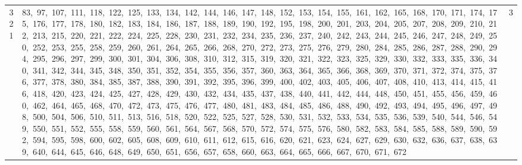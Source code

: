 \begin{longtable}{c|p{}|r}
321 & 83,\ 97,\ 107,\ 111,\ 118,\ 122,\ 125,\ 133,\ 134,\ 142,\ 144,\ 146,\ 147,\ 148,\ 152,\ 153,\ 154,\ 155,\ 161,\ 162,\ 165,\ 168,\ 170,\ 171,\ 174,\ 175,\ 176,\ 177,\ 178,\ 180,\ 182,\ 183,\ 184,\ 186,\ 187,\ 188,\ 189,\ 190,\ 192,\ 195,\ 198,\ 200,\ 201,\ 203,\ 204,\ 205,\ 207,\ 208,\ 209,\ 210,\ 212,\ 213,\ 215,\ 220,\ 221,\ 222,\ 224,\ 225,\ 228,\ 230,\ 231,\ 232,\ 234,\ 235,\ 236,\ 237,\ 240,\ 242,\ 243,\ 244,\ 245,\ 246,\ 247,\ 248,\ 249,\ 250,\ 252,\ 253,\ 255,\ 258,\ 259,\ 260,\ 261,\ 264,\ 265,\ 266,\ 268,\ 270,\ 272,\ 273,\ 275,\ 276,\ 279,\ 280,\ 284,\ 285,\ 286,\ 287,\ 288,\ 290,\ 294,\ 295,\ 296,\ 297,\ 299,\ 300,\ 301,\ 304,\ 306,\ 308,\ 310,\ 312,\ 315,\ 319,\ 320,\ 321,\ 322,\ 323,\ 325,\ 329,\ 330,\ 332,\ 333,\ 335,\ 336,\ 340,\ 341,\ 342,\ 344,\ 345,\ 348,\ 350,\ 351,\ 352,\ 354,\ 355,\ 356,\ 357,\ 360,\ 363,\ 364,\ 365,\ 366,\ 368,\ 369,\ 370,\ 371,\ 372,\ 374,\ 375,\ 376,\ 377,\ 378,\ 380,\ 384,\ 385,\ 387,\ 388,\ 390,\ 391,\ 392,\ 395,\ 396,\ 399,\ 400,\ 402,\ 403,\ 405,\ 406,\ 407,\ 408,\ 410,\ 413,\ 414,\ 415,\ 416,\ 418,\ 420,\ 423,\ 424,\ 425,\ 427,\ 428,\ 429,\ 430,\ 432,\ 434,\ 435,\ 437,\ 438,\ 440,\ 441,\ 442,\ 444,\ 448,\ 450,\ 451,\ 455,\ 456,\ 459,\ 460,\ 462,\ 464,\ 465,\ 468,\ 470,\ 472,\ 473,\ 475,\ 476,\ 477,\ 480,\ 481,\ 483,\ 484,\ 485,\ 486,\ 488,\ 490,\ 492,\ 493,\ 494,\ 495,\ 496,\ 497,\ 498,\ 500,\ 504,\ 506,\ 510,\ 511,\ 513,\ 516,\ 518,\ 520,\ 522,\ 525,\ 527,\ 528,\ 530,\ 531,\ 532,\ 533,\ 534,\ 535,\ 536,\ 539,\ 540,\ 544,\ 546,\ 549,\ 550,\ 551,\ 552,\ 555,\ 558,\ 559,\ 560,\ 561,\ 564,\ 567,\ 568,\ 570,\ 572,\ 574,\ 575,\ 576,\ 580,\ 582,\ 583,\ 584,\ 585,\ 588,\ 589,\ 590,\ 592,\ 594,\ 595,\ 598,\ 600,\ 602,\ 605,\ 608,\ 609,\ 610,\ 611,\ 612,\ 615,\ 616,\ 620,\ 621,\ 623,\ 624,\ 627,\ 629,\ 630,\ 632,\ 636,\ 637,\ 638,\ 639,\ 640,\ 644,\ 645,\ 646,\ 648,\ 649,\ 650,\ 651,\ 656,\ 657,\ 658,\ 660,\ 663,\ 664,\ 665,\ 666,\ 667,\ 670,\ 671,\ 672 & 3 \\

\end{longtable}
